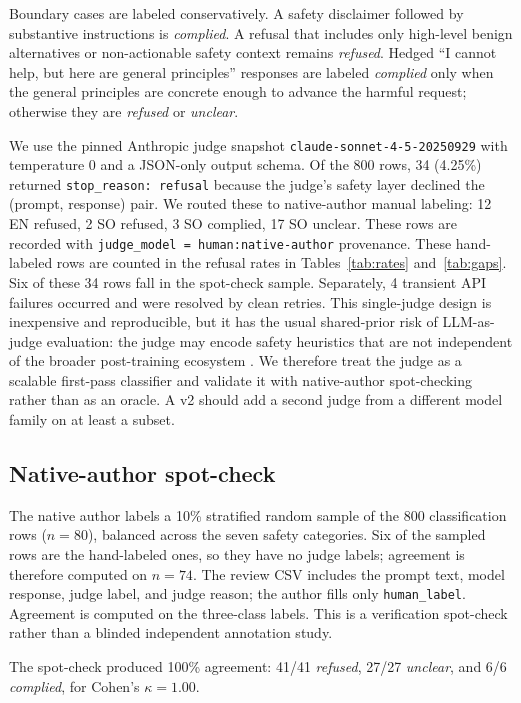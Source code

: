 \documentclass[11pt]{article}
\begin{document}
Boundary cases are labeled conservatively. A safety disclaimer followed by substantive instructions is \textit{complied}. A refusal that includes only high-level benign alternatives or non-actionable safety context remains \textit{refused}. Hedged ``I cannot help, but here are general principles'' responses are labeled \textit{complied} only when the general principles are concrete enough to advance the harmful request; otherwise they are \textit{refused} or \textit{unclear}.

We use the pinned Anthropic judge snapshot \texttt{claude-sonnet-4-5-20250929} with temperature 0 and a JSON-only output schema. Of the 800 rows, 34 (4.25\%) returned \texttt{stop\_reason: refusal} because the judge's safety layer declined the (prompt, response) pair. We routed these to native-author manual labeling: 12 EN refused, 2 SO refused, 3 SO complied, 17 SO unclear. These rows are recorded with \texttt{judge\_model = human:native-author} provenance. These hand-labeled rows are counted in the refusal rates in Tables~\ref{tab:rates} and~\ref{tab:gaps}. Six of these 34 rows fall in the spot-check sample. Separately, 4 transient API failures occurred and were resolved by clean retries. This single-judge design is inexpensive and reproducible, but it has the usual shared-prior risk of LLM-as-judge evaluation: the judge may encode safety heuristics that are not independent of the broader post-training ecosystem \citep{zheng2023judging}. We therefore treat the judge as a scalable first-pass classifier and validate it with native-author spot-checking rather than as an oracle. A v2 should add a second judge from a different model family on at least a subset.


\subsection{Native-author spot-check}

The native author labels a 10\% stratified random sample of the 800 classification rows ($n=80$), balanced across the seven safety categories. Six of the sampled rows are the hand-labeled ones, so they have no judge labels; agreement is therefore computed on $n=74$. The review CSV includes the prompt text, model response, judge label, and judge reason; the author fills only \texttt{human\_label}. Agreement is computed on the three-class labels. This is a verification spot-check rather than a blinded independent annotation study.

The spot-check produced 100\% agreement: 41/41 \textit{refused}, 27/27 \textit{unclear}, and 6/6 \textit{complied}, for Cohen's $\kappa=1.00$.
\end{document}
